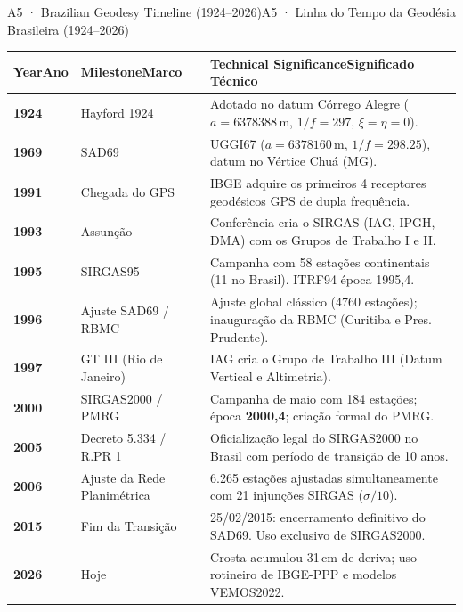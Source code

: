 \documentclass[aspectratio=169,11pt]{beamer}
\newcommand{\tr}[2]{\ifEN#2\else#1\fi}
\newcommand{\bnum}[1]{\ifmmode\textcolor{mTeal}{\mathbf{#1}}\else\textbf{\textcolor{mTeal}{#1}}\fi}
\begin{document}
\begin{frame}{\tr{A5 · Linha do Tempo da Geodésia Brasileira (1924--2026)}{A5 · Brazilian Geodesy Timeline (1924--2026)}}
  \tiny
  \begin{tabular}{llp{9.5cm}}
    \toprule
    \textbf{\tr{Ano}{Year}} & \textbf{\tr{Marco}{Milestone}} & \textbf{\tr{Significado Técnico}{Technical Significance}} \\
    \midrule
    \textbf{1924} & Hayford 1924 & Adotado no datum Córrego Alegre ($a=\num{6378388}$\,m, $1/f=\num{297}$, $\xi=\eta=0$). \\
    \textbf{1969} & SAD69 & UGGI67 ($a=\num{6378160}$\,m, $1/f=\num{298.25}$), datum no Vértice Chuá (MG). \\
    \textbf{1991} & Chegada do GPS & IBGE adquire os primeiros \num{4} receptores geodésicos GPS de dupla frequência. \\
    \textbf{1993} & Assunção & Conferência cria o SIRGAS (IAG, IPGH, DMA) com os Grupos de Trabalho I e II. \\
    \textbf{1995} & SIRGAS95 & Campanha com \num{58} estações continentais (\num{11} no Brasil). ITRF94 época 1995,4. \\
    \textbf{1996} & Ajuste SAD69 / RBMC & Ajuste global clássico (4760 estações); inauguração da RBMC (Curitiba e Pres. Prudente). \\
    \textbf{1997} & GT III (Rio de Janeiro) & IAG cria o Grupo de Trabalho III (Datum Vertical e Altimetria). \\
    \textbf{2000} & SIRGAS2000 / PMRG & Campanha de maio com \num{184} estações; época \bnum{2000,4}; criação formal do PMRG. \\
    \textbf{2005} & Decreto 5.334 / R.PR 1 & Oficialização legal do SIRGAS2000 no Brasil com período de transição de 10 anos. \\
    \textbf{2006} & Ajuste da Rede Planimétrica & 6.265 estações ajustadas simultaneamente com \num{21} injunções SIRGAS ($\sigma/10$). \\
    \textbf{2015} & Fim da Transição & 25/02/2015: encerramento definitivo do SAD69. Uso exclusivo de SIRGAS2000. \\
    \textbf{2026} & Hoje & Crosta acumulou \num{31}\,cm de deriva; uso rotineiro de IBGE-PPP e modelos VEMOS2022. \\
    \bottomrule
  \end{tabular}
\end{frame}
\end{document}

